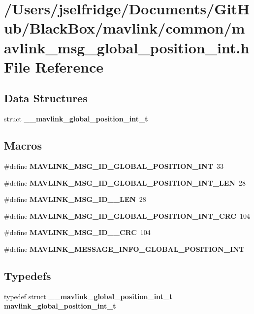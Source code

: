 \section{/\+Users/jselfridge/\+Documents/\+Git\+Hub/\+Black\+Box/mavlink/common/mavlink\+\_\+msg\+\_\+global\+\_\+position\+\_\+int.h File Reference}
\label{mavlink__msg__global__position__int_8h}
\subsection*{Data Structures}
\begin{DoxyCompactItemize}
\item 
struct \textbf{ \+\_\+\+\_\+mavlink\+\_\+global\+\_\+position\+\_\+int\+\_\+t}
\end{DoxyCompactItemize}
\subsection*{Macros}
\begin{DoxyCompactItemize}
\item 
\#define \textbf{ M\+A\+V\+L\+I\+N\+K\+\_\+\+M\+S\+G\+\_\+\+I\+D\+\_\+\+G\+L\+O\+B\+A\+L\+\_\+\+P\+O\+S\+I\+T\+I\+O\+N\+\_\+\+I\+NT}~33
\item 
\#define \textbf{ M\+A\+V\+L\+I\+N\+K\+\_\+\+M\+S\+G\+\_\+\+I\+D\+\_\+\+G\+L\+O\+B\+A\+L\+\_\+\+P\+O\+S\+I\+T\+I\+O\+N\+\_\+\+I\+N\+T\+\_\+\+L\+EN}~28
\item 
\#define \textbf{ M\+A\+V\+L\+I\+N\+K\+\_\+\+M\+S\+G\+\_\+\+I\+D\+\_\+\_\+\+L\+EN}~28
\item 
\#define \textbf{ M\+A\+V\+L\+I\+N\+K\+\_\+\+M\+S\+G\+\_\+\+I\+D\+\_\+\+G\+L\+O\+B\+A\+L\+\_\+\+P\+O\+S\+I\+T\+I\+O\+N\+\_\+\+I\+N\+T\+\_\+\+C\+RC}~104
\item 
\#define \textbf{ M\+A\+V\+L\+I\+N\+K\+\_\+\+M\+S\+G\+\_\+\+I\+D\+\_\+\_\+\+C\+RC}~104
\item 
\#define \textbf{ M\+A\+V\+L\+I\+N\+K\+\_\+\+M\+E\+S\+S\+A\+G\+E\+\_\+\+I\+N\+F\+O\+\_\+\+G\+L\+O\+B\+A\+L\+\_\+\+P\+O\+S\+I\+T\+I\+O\+N\+\_\+\+I\+NT}
\end{DoxyCompactItemize}
\subsection*{Typedefs}
\begin{DoxyCompactItemize}
\item 
typedef struct \textbf{ \+\_\+\+\_\+mavlink\+\_\+global\+\_\+position\+\_\+int\+\_\+t} \textbf{ mavlink\+\_\+global\+\_\+position\+\_\+int\+\_\+t}
\end{DoxyCompactItemize}


